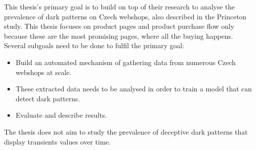
This thesis's primary goal is to build on top of their research to analyse the prevalence of dark patterns on Czech webshops, also described in the Princeton study\cite{dark-patterns-at-scale}. This thesis focuses on product pages and product purchase flow only because these are the most promising pages, where all the buying happens. Several subgoals need to be done to fulfil the primary goal:
\begin{itemize}
    \item Build an automated mechanism of gathering data from numerous Czech webshops at scale.
    \item These extracted data needs to be analysed in order to train a model that can detect dark patterns.
    \item Evaluate and describe results.
\end{itemize}

The thesis does not aim to study the prevalence of deceptive dark patterns that display transients values over time.